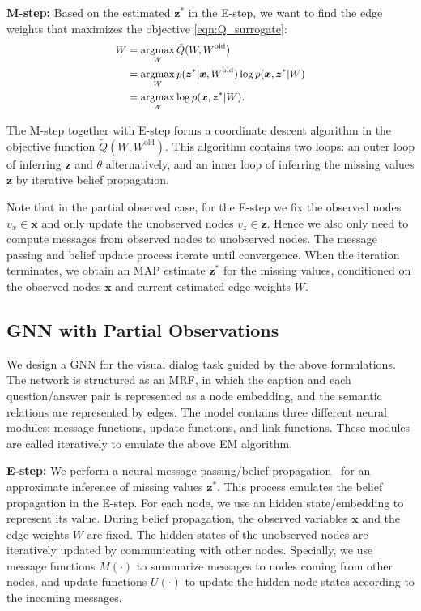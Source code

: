 \documentclass[10pt,twocolumn,letterpaper]{article}
\DeclareMathOperator*{\argmax}{argmax}
\begin{document}
\noindent\textbf{M-step:} Based on the estimated $\bm{z}^{*}$ in the E-step, we want to find the edge weights that maximizes the objective \autoref{eqn:Q_surrogate}:
\vspace*{-4pt}
\begin{equation}\small
\begin{aligned}
W &= \argmax_{W} \tilde{Q}(W, W^{\text{old}}) \\
&= \argmax_{W} p(\bm{z}^{*} | \bm{x}, W^{\text{old}}) \log p(\bm{x}, \bm{z}^{*} | W)\\
&= \argmax_{W} \log p(\bm{x}, \bm{z}^{*} | W).
\end{aligned}
\vspace*{-2pt}
\end{equation}

The M-step together with E-step forms a coordinate descent algorithm in the objective function $\tilde{Q}(W, W^{\text{old}})$. This algorithm contains two loops: an outer loop of inferring $\bm{z}$ and $\theta$ alternatively, and an inner loop of inferring the missing values $\bm{z}$ by iterative belief propagation.

Note that in the partial observed case, for the E-step we fix the observed nodes $v_{x}\!\in\!\bm{x}$ and only update the unobserved nodes $v_{z}\!\in\!\bm{z}$. Hence we also only need to compute messages from observed nodes to unobserved nodes. The message passing and belief update process iterate until convergence. When the iteration terminates, we obtain an MAP estimate $\bm{z}^{*}$ for the missing values, conditioned on the observed nodes $\bm{x}$ and current estimated edge weights $W$.







\subsection{GNN with Partial Observations}\label{sec:gnn}
We design a GNN for the visual dialog task guided by the above formulations. The network is structured as an MRF, in which the caption and each question/answer pair is represented as a node embedding, and the semantic relations are represented by edges. The model contains three different neural modules: message functions, update functions, and link functions. These modules are called iteratively to emulate the above EM algorithm.

\noindent\textbf{E-step:} We perform a neural message passing/belief propagation~\cite{gilmer2017neural} for an approximate inference of missing values $\bm{z}^{*}$. This process emulates the belief propagation in the E-step. For each node, we use an hidden state/embedding to represent its value. During belief propagation, the observed variables $\bm{x}$ and the edge weights $W$ are fixed. The hidden states of the unobserved nodes are iteratively updated by communicating with other nodes. Specially, we use message functions $M(\cdot)$ to summarize messages to nodes coming from other nodes, and update functions $U(\cdot)$ to update the hidden node states according to the incoming messages.
\end{document}
